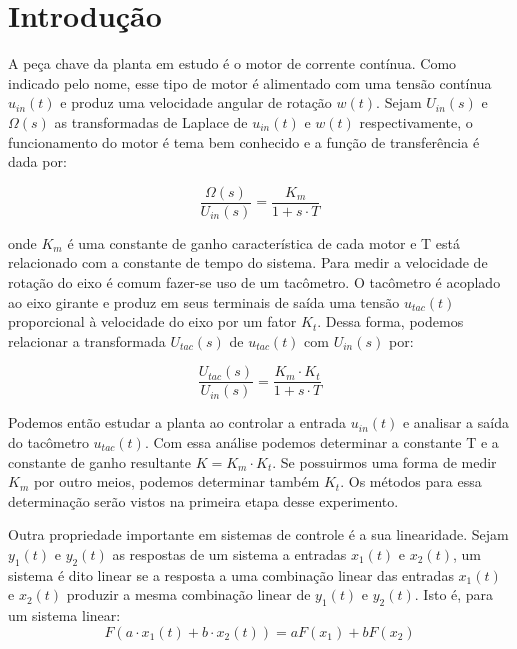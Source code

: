 \section{Introdução}
A peça chave da planta em estudo é o motor de corrente contínua. Como indicado pelo nome, esse tipo de motor é alimentado com uma tensão contínua $u_{in}(t)$ e produz uma velocidade angular de rotação $w(t)$. Sejam $U_{in}(s)$ e $\Omega(s)$ as transformadas de Laplace de $u_{in}(t)$ e $w(t)$ respectivamente, o funcionamento do motor é tema bem conhecido e a função de transferência é dada por:

\begin{equation}
		\frac{\Omega(s)}{U_{in}(s)} = \frac{K_m}{1 + s \cdot T}
         \label{eq:U-W}
\end{equation}

onde $K_m$ é uma constante de ganho característica de cada motor e T está relacionado com a constante de tempo do sistema. Para medir a velocidade de rotação do eixo é comum fazer-se uso de um tacômetro. O tacômetro é acoplado ao eixo girante e produz em seus terminais de saída uma tensão $u_{tac}(t)$ proporcional à velocidade do eixo por um fator $K_t$. Dessa forma, podemos relacionar a transformada $U_{tac}(s)$ de $u_{tac}(t)$ com $U_{in}(s)$ por:

\begin{equation}
		\frac{U_{tac}(s)}{U_{in}(s)} = \frac{K_m \cdot K_t}{1 + s \cdot T}
\end{equation}

Podemos então estudar a planta ao controlar a entrada $u_{in}(t)$ e analisar a saída do tacômetro $u_{tac}(t)$. Com essa análise podemos determinar a constante T e a constante de ganho resultante $K = K_m \cdot K_t$. Se possuirmos uma forma de medir $K_m$ por outro meios, podemos determinar também $K_t$. Os métodos para essa determinação serão vistos na primeira etapa desse experimento. 


Outra propriedade importante em sistemas de controle é a sua linearidade. Sejam $y_1(t)$ e $y_2(t)$  as respostas de um sistema a entradas $x_1(t)$ e $x_2(t)$, um sistema é dito linear se a resposta a uma combinação linear das entradas $x_1(t)$ e $x_2(t)$ produzir a mesma combinação linear de $y_1(t)$ e $y_2(t)$. Isto é, para um sistema linear:
\begin{equation}
	F(a \cdot x_1(t) + b \cdot x_2(t)) = aF(x_1) + bF(x_2)
\end{equation}
 
